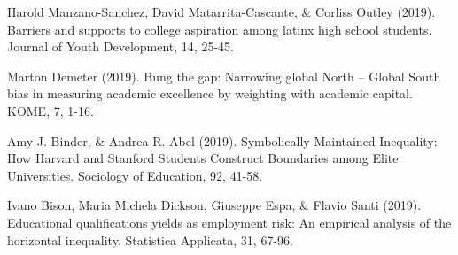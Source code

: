 \documentclass[runningheads]{llncs}
\begin{document}
\begin{multicols}{2}
Harold Manzano-Sanchez, David Matarrita-Cascante, \& Corliss Outley (2019). Barriers and supports to college aspiration among latinx high school students. Journal of Youth Development, 14, 25-45.

Marton Demeter (2019). Bung the gap: Narrowing global North – Global South bias in measuring academic excellence by weighting with academic capital. KOME, 7, 1-16.

Amy J. Binder, \& Andrea R. Abel (2019). Symbolically Maintained Inequality: How Harvard and Stanford Students Construct Boundaries among Elite Universities. Sociology of Education, 92, 41-58.

Ivano Bison, Maria Michela Dickson, Giuseppe Espa, \& Flavio Santi (2019). Educational qualifications yields as employment risk: An empirical analysis of the horizontal inequality. Statistica Applicata, 31, 67-96.

\end{multicols}
\end{document}
